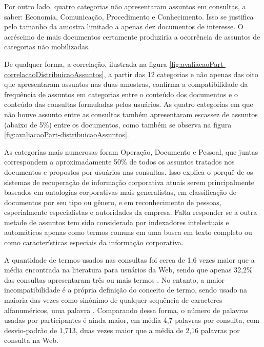 Por outro lado, quatro categorias não apresentaram assuntos em consultas, a saber: Economia, Comunicação, Procedimento e Conhecimento. Isso se justifica pelo tamanho da amostra limitado a apenas dez documentos de interesse. O acréscimo de mais documentos certamente produziria a ocorrência de assuntos de categorias não mobilizadas.

De qualquer forma, a correlação, ilustrada na figura \ref{fig:avaliacaoPart-correlacaoDistribuicaoAssuntos}, a partir das 12 categorias e não apenas das oito que apresentaram assuntos nas duas amostras, confirma a compatibilidade da frequência de assuntos em categorias entre o conteúdo dos documentos e o conteúdo das consultas formuladas pelos usuários. As quatro categorias em que não houve assunto entre as consultas também apresentaram escassez de assuntos (abaixo de 5\%) entre os documentos, como também se observa na figura \ref{fig:avaliacaoPart-distribuicaoAssuntos}.

As categorias mais numerosas foram Operação, Documento e Pessoal, que juntas correspondem a aproximadamente 50\% de todos os assuntos tratados nos documentos e propostos por usuários nas consultas. Isso explica o porquê de os sistemas de recuperação de informação corporativa atuais serem principalmente baseados em ontologias corporativas mais generalistas, em classificação de documentos por seu tipo ou gênero, e em reconhecimento de pessoas, especialmente especialistas e autoridades da empresa. Falta responder se a outra metade de assuntos tem sido considerada por indexadores intelectuais e automáticos apenas como termos comuns em uma busca em texto completo ou como características especiais da informação corporativa.

A quantidade de termos usados nas consultas foi cerca de 1,6 vezes maior que a média encontrada na literatura para usuários da Web, sendo que apenas 32,2\% das consultas apresentaram três ou mais termos \cite{relevantEnterpriseData11,spink2001searching}. No entanto, a maior incompatibilidade é a própria definição do conceito de termo, sendo usado na maioria das vezes como sinônimo de qualquer sequência de caracteres alfanuméricos, uma palavra \cite{spink2001searching}. Comparando dessa forma, o número de palavras usadas por participantes é ainda maior, em média 4,7 palavras por consulta, com desvio-padrão de 1,713, duas vezes maior que a média de 2,16 palavras por consulta na Web.

